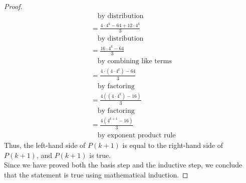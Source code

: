 \documentclass[name=Ojas\ Chaturvedi, emailid=oj.chaturvedi.2024, course=Capstone:\ Discrete\ Math, num=8, deadline={November\ 2,\ 2023}]{homework}
\begin{document}
\begin{proof}
\begin{align*}
        & \quad \text{by distribution} \\
        &= \frac{4 \cdot 4^k - 64 + 12 \cdot 4^k}{3} \\
        & \quad \text{by distribution} \\
        &= \frac{16 \cdot 4^k - 64}{3} \\
        & \quad \text{by combining like terms} \\
        &= \frac{4 \cdot (4 \cdot 4^k) - 64}{3} \\
        & \quad \text{by factoring} \\
        &= \frac{4 ((4 \cdot 4^k) - 16)}{3} \\
        & \quad \text{by factoring} \\
        &= \frac{4 (4^{k+1} - 16)}{3} \\
        & \quad \text{by exponent product rule}
    \end{align*}
    Thus, the left-hand side of $P(k+1)$ is equal to the right-hand side of $P(k+1)$, and $P(k+1)$ is true. \\
    Since we have proved both the basis step and the inductive step, we conclude that the statement is true using mathematical induction.
\end{proof}
\end{document}
